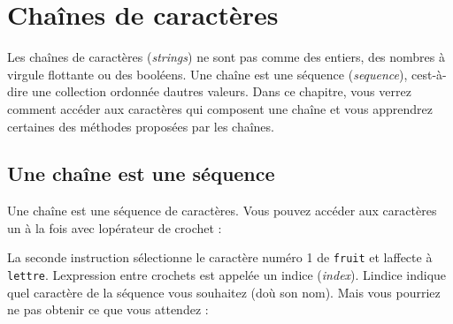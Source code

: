 \hypertarget{chauxeenes-de-caractuxe8res}{%
\section{Chaînes de caractères}\label{chauxeenes-de-caractuxe8res}}

Les chaînes de caractères (\emph{strings}) ne sont pas comme des
entiers, des nombres à virgule flottante ou des booléens. Une chaîne est
une séquence (\emph{sequence}), c\textquotesingle est-à-dire une
collection ordonnée d\textquotesingle autres valeurs. Dans ce chapitre,
vous verrez comment accéder aux caractères qui composent une chaîne et
vous apprendrez certaines des méthodes proposées par les chaînes.

\hypertarget{une-chauxeene-est-une-suxe9quence}{%
\subsection{Une chaîne est une
séquence}\label{une-chauxeene-est-une-suxe9quence}}

Une chaîne est une séquence de caractères. Vous pouvez accéder aux
caractères un à la fois avec l\textquotesingle opérateur de crochet :

\begin{Shaded}
\begin{Highlighting}[]
\OperatorTok{\textgreater{}\textgreater{}\textgreater{}}\OperatorTok{=} 
\OperatorTok{\textgreater{}\textgreater{}\textgreater{}}\OperatorTok{=}\NormalTok{ fruit[}\NormalTok{]}
\end{Highlighting}
\end{Shaded}

La seconde instruction sélectionne le caractère numéro 1 de
\texttt{fruit} et l\textquotesingle affecte à \texttt{lettre}.
L\textquotesingle expression entre crochets est appelée un indice
(\emph{index}). L\textquotesingle indice indique quel caractère de la
séquence vous souhaitez (d\textquotesingle où son nom). Mais vous
pourriez ne pas obtenir ce que vous attendez :

\begin{Shaded}
\begin{Highlighting}[]
\OperatorTok{\textgreater{}\textgreater{}\textgreater{}}
\end{Highlighting}
\end{Shaded}

